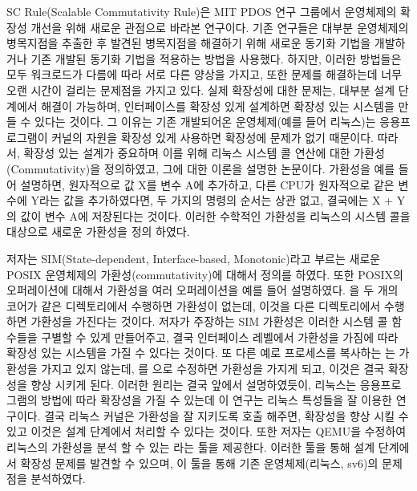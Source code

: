 SC Rule(Scalable Commutativity Rule)은 MIT PDOS 연구 그룹에서 운영체제의 확장성 개선을 위해 새로운
관점으로 바라본 연구이다.
기존 연구들은 대부분 운영체제의 병목지점을 추출한 후 발견된 병목지점을 해결하기 위해 새로운 
동기화 기법을 개발하거나 기존 개발된 동기화 기법을 적용하는 방법을 사용했다. 
하지만, 이러한 방법들은 모두 워크로드가 다름에 따라 서로 다른 양상을 가지고, 
또한 문제를 해결하는데 너무 오랜 시간이 걸리는 문제점을 가지고 있다.
실제 확장성에 대한 문제는, 대부분 설계 단계에서 해결이 가능하며, 인터페이스를 확장성 있게 설계하면 
확장성 있는 시스템을 만들 수 있다는 것이다.
그 이유는 기존 개발되어온 운영체제(예를 들어 리눅스)는 응용프로그램이 커널의 자원을 
확장성 있게 사용하면 확장성에 문제가 없기 때문이다. 
따라서, 확장성 있는 설계가 중요하며 이를 위해 리눅스 시스템 콜 연산에 대한 가환성(Commutativity)을 정의하였고, 
그에 대한 이론을 설명한 논문이다.
가환성을 예를 들어 설명하면, 원자적으로 값 X를 변수 A에 추가하고, 
다른 CPU가 원자적으로 같은 변수에 Y라는 값을 추가하였다면, 
두 가지의 명령의 순서는 상관 없고, 결국에는 X + Y의 값이 변수 A에 저장된다는 것이다.
이러한 수학적인 가환성을 리눅스의 시스템 콜을 대상으로 새로운 가환성을 정의 하였다.

저자는 SIM(State-dependent, Interface-based, Monotonic)라고 부르는 새로운
POSIX 운영체제의 가환성(commutativity)에 대해서 정의를 하였다.
또한 POSIX의 오퍼레이션에 대해서 가환성을 여러 오퍼레이션을 예를 들어 설명하였다.
을 두 개의 코어가 같은 디렉토리에서 수행하면 가환성이 없는데, 
이것을 다른 디렉토리에서 수행하면 가환성을 가진다는 것이다.
저자가 주장하는 SIM 가환성은 이러한 시스템 콜 함수들을 구별할 수 있게 만들어주고, 결국 
인터페이스 레벨에서 가환성을 가짐에 따라 확장성 있는 시스템을 가질 수 있다는 것이다.  
또 다른 예로 프로세스를 복사하는 는 가환성을 가지고 있지 않는데, 
를 으로 수정하면 가환성을 가지게 되고, 이것은 결국 
확장성을 향상 시키게 된다. 
이러한 원리는 결국 앞에서 설명하였듯이, 리눅스는 응용프로그램의 방법에 따라 확장성을 가질 수 있는데 
이 연구는 리눅스 특성들을 잘 이용한 연구이다. 
결국 리눅스 커널은 가환성을 잘 지키도록 호출 해주면, 확장성을 향상 시킬 수 있고 
이것은 설계 단계에서 처리할 수 있다는 것이다.
또한 저자는 QEMU을 수정하여 리눅스의 가환성을 분석 할 수 있는 라는 툴을 제공한다. 
이러한 툴을 통해 설계 단계에서 확장성 문제를 발견할 수 있으며, 이 툴을 통해 기존 운영체제(리눅스, sv6)의 
문제점을 분석하였다. 

